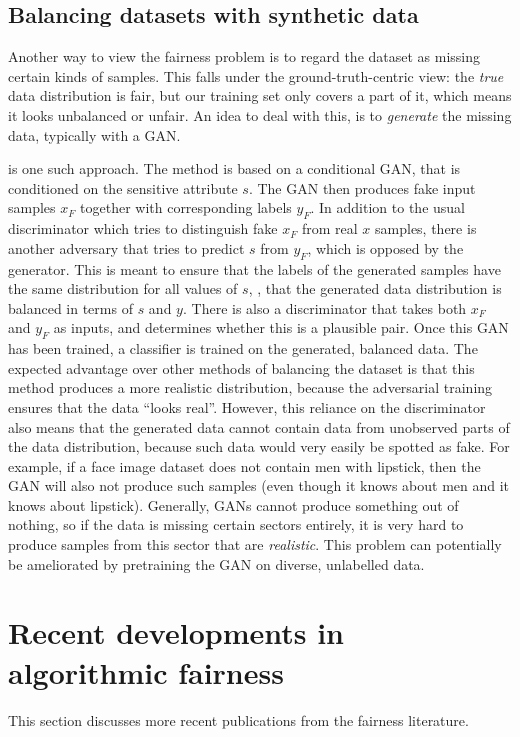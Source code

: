 \subsection{Balancing datasets with synthetic data} Another way to view the fairness problem is to
regard the dataset as missing certain kinds of samples. This falls under the ground-truth-centric
view: the \emph{true} data distribution is fair, but our training set only covers a part of it,
which means it looks unbalanced or unfair. An idea to deal with this, is to \emph{generate} the
missing data, typically with a \ac{GAN}.

\citet{sattigeri2019fairness} is one such approach. The method is based on a conditional \ac{GAN},
that is conditioned on the sensitive attribute \(s\). The \ac{GAN} then produces fake input samples
\(x_F\) together with corresponding labels \(y_F\). In addition to the usual discriminator which
tries to distinguish fake \(x_F\) from real \(x\) samples, there is another adversary that tries to
predict \(s\) from \(y_F\), which is opposed by the generator. This is meant to ensure that the
labels of the generated samples have the same distribution for all values of \(s\), \ie, that the
generated data distribution is balanced in terms of \(s\) and \(y\). There is also a discriminator
that takes both \(x_F\) and \(y_F\) as inputs, and determines whether this is a plausible pair.
Once this \ac{GAN} has been trained, a classifier is trained on the generated, balanced data. The
expected advantage over other methods of balancing the dataset is that this method produces a more
realistic distribution, because the adversarial training ensures that the data ``looks real''.
However, this reliance on the discriminator also means that the generated data cannot contain data
from unobserved parts of the data distribution, because such data would very easily be spotted as
fake. For example, if a face image dataset does not contain men with lipstick, then the \ac{GAN}
will also not produce such samples (even though it knows about men and it knows about lipstick).
Generally, \acp{GAN} cannot produce something out of nothing, so if the data is missing certain
sectors entirely, it is very hard to produce samples from this sector that are \emph{realistic}.
This problem can potentially be ameliorated by pretraining the \ac{GAN} on diverse, unlabelled
data.

\section{Recent developments in algorithmic fairness}%
\label{sec:refinement-on-previous-ideas-for-fair-classification-and-fair-representations} This
section discusses more recent publications from the fairness literature.

